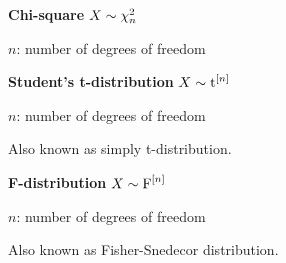 \nodata

\vspace{10pt} \noindent \textbf{Chi-square}
$X \sim \chi^2_n$

$n$: number of degrees of freedom

\vspace{10pt} \noindent \textbf{Student's t-distribution}
$X \sim \textrm{t}^{[n]}$

$n$: number of degrees of freedom

Also known as simply t-distribution.

\vspace{10pt} \noindent \textbf{F-distribution}
$X \sim \textrm{F}^{[n]}$

$n$: number of degrees of freedom

Also known as Fisher-Snedecor distribution.
